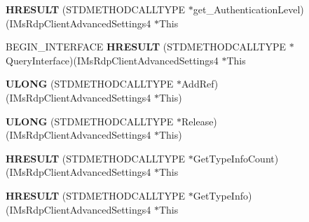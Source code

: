 \begin{DoxyCompactItemize}
\item 
\mbox{\label{struct_i_ms_rdp_client_advanced_settings4_vtbl_adddd71e71b6b0323a56a12329078d1d1}} 
{\bfseries H\+R\+E\+S\+U\+LT} (S\+T\+D\+M\+E\+T\+H\+O\+D\+C\+A\+L\+L\+T\+Y\+PE $\ast$get\+\_\+\+Authentication\+Level)(I\+Ms\+Rdp\+Client\+Advanced\+Settings4 $\ast$This
\item 
\mbox{\label{struct_i_ms_rdp_client_advanced_settings4_vtbl_a9526bd52239d58b792664d87ef74cf61}} 
B\+E\+G\+I\+N\+\_\+\+I\+N\+T\+E\+R\+F\+A\+CE {\bfseries H\+R\+E\+S\+U\+LT} (S\+T\+D\+M\+E\+T\+H\+O\+D\+C\+A\+L\+L\+T\+Y\+PE $\ast$Query\+Interface)(I\+Ms\+Rdp\+Client\+Advanced\+Settings4 $\ast$This
\item 
\mbox{\label{struct_i_ms_rdp_client_advanced_settings4_vtbl_afe0cd3c7de0a672f9d996d3308df8821}} 
{\bfseries U\+L\+O\+NG} (S\+T\+D\+M\+E\+T\+H\+O\+D\+C\+A\+L\+L\+T\+Y\+PE $\ast$Add\+Ref)(I\+Ms\+Rdp\+Client\+Advanced\+Settings4 $\ast$This)
\item 
\mbox{\label{struct_i_ms_rdp_client_advanced_settings4_vtbl_a6920863e7bdb34af92ed39743c07f362}} 
{\bfseries U\+L\+O\+NG} (S\+T\+D\+M\+E\+T\+H\+O\+D\+C\+A\+L\+L\+T\+Y\+PE $\ast$Release)(I\+Ms\+Rdp\+Client\+Advanced\+Settings4 $\ast$This)
\item 
\mbox{\label{struct_i_ms_rdp_client_advanced_settings4_vtbl_a4c82a9ea310093a7e7f92839d0077c5f}} 
{\bfseries H\+R\+E\+S\+U\+LT} (S\+T\+D\+M\+E\+T\+H\+O\+D\+C\+A\+L\+L\+T\+Y\+PE $\ast$Get\+Type\+Info\+Count)(I\+Ms\+Rdp\+Client\+Advanced\+Settings4 $\ast$This
\item 
\mbox{\label{struct_i_ms_rdp_client_advanced_settings4_vtbl_adceb0e181ed98e2abe46c51f7f507bdf}} 
{\bfseries H\+R\+E\+S\+U\+LT} (S\+T\+D\+M\+E\+T\+H\+O\+D\+C\+A\+L\+L\+T\+Y\+PE $\ast$Get\+Type\+Info)(I\+Ms\+Rdp\+Client\+Advanced\+Settings4 $\ast$This
\item 
\mbox{\label{struct_i_ms_rdp_client_advanced_settings4_vtbl_a20b1b57c250b1499662867991fe8afee}} 

\end{DoxyCompactItemize}
